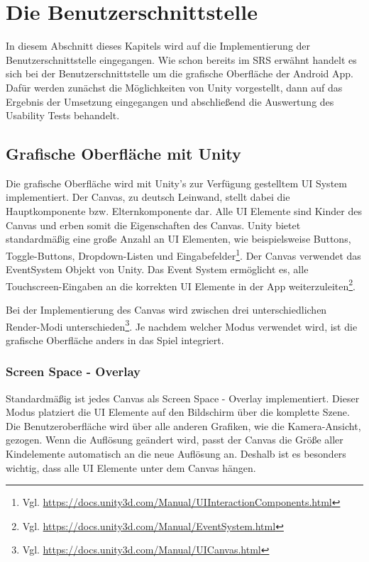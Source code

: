\section{Die Benutzerschnittstelle}
	In diesem Abschnitt dieses Kapitels wird auf die Implementierung der Benutzerschnittstelle eingegangen. Wie schon bereits im SRS erwähnt handelt es sich bei der Benutzerschnittstelle um die grafische Oberfläche der Android App. Dafür werden zunächst die Möglichkeiten von Unity vorgestellt, dann auf das Ergebnis der Umsetzung eingegangen und abschließend die Auswertung des Usability Tests behandelt.
	
	\subsection{Grafische Oberfläche mit Unity}
		Die grafische Oberfläche wird mit Unity's zur Verfügung gestelltem UI System implementiert. Der Canvas, zu deutsch Leinwand, stellt dabei die Hauptkomponente bzw. Elternkomponente dar. Alle UI Elemente sind Kinder des Canvas und erben somit die Eigenschaften des Canvas. Unity bietet standardmäßig eine große Anzahl an UI Elementen, wie beispielsweise Buttons, Toggle-Buttons, Dropdown-Listen und Eingabefelder\footnote{Vgl. \url{https://docs.unity3d.com/Manual/UIInteractionComponents.html}}. Der Canvas verwendet das EventSystem Objekt von Unity. Das Event System ermöglicht es, alle Touchscreen-Eingaben an die korrekten UI Elemente in der App weiterzuleiten\footnote{Vgl. \url{https://docs.unity3d.com/Manual/EventSystem.html}}.
		
		Bei der Implementierung des Canvas wird zwischen drei unterschiedlichen Render-Modi unterschieden\footnote{Vgl. \url{https://docs.unity3d.com/Manual/UICanvas.html}}. Je nachdem welcher Modus verwendet wird, ist die grafische Oberfläche anders in das Spiel integriert.
		
		\subsubsection{Screen Space - Overlay}
			Standardmäßig ist jedes Canvas als Screen Space - Overlay implementiert. Dieser Modus platziert die UI Elemente auf den Bildschirm über die komplette Szene. Die Benutzeroberfläche wird über alle anderen Grafiken, wie die Kamera-Ansicht, gezogen. Wenn die Auflösung geändert wird, passt der Canvas die Größe aller Kindelemente automatisch an die neue Auflösung an. Deshalb ist es besonders wichtig, dass alle UI Elemente unter dem Canvas hängen. 
			

